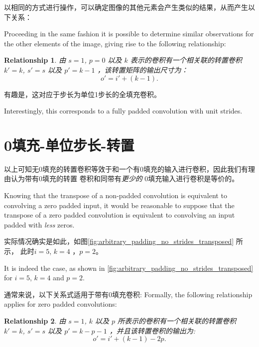 \documentclass[notitlepage]{report}
\newtheorem{relationship}{Relationship}
\begin{document}
以相同的方式进行操作，可以确定图像的其他元素会产生类似的结果，从而产生以下关系：

Proceeding in the same fashion it is possible to determine similar observations
for the other elements of the image, giving rise to the following relationship:

\begin{relationship}\label{rel:no_padding_no_strides_transposed}
由 $s = 1$, $p = 0$ 以及 $k$ 表示的卷积有一个相关联的转置卷积$k' = k$, $s' = s$ 以及
 $p' = k - 1$ ，该转置矩阵的输出尺寸为：
\begin{equation*}
    o' = i' + (k - 1).
\end{equation*}
\end{relationship}

有趣是，这对应于步长为单位1步长的全填充卷积。

Interestingly, this corresponds to a fully padded convolution with unit
strides.

\section{0填充-单位步长-转置}

以上可知无0填充的转置卷积等效于和一个有0填充的输入进行卷积，因此我们有理由认为带有0填充的转置
卷积和同带有{\em 更少的 \/}0填充输入进行卷积是等价的。

Knowing that the transpose of a non-padded convolution is equivalent to
convolving a zero padded input, it would be reasonable to suppose that the
transpose of a zero padded convolution is equivalent to convolving an input
padded with {\em less\/} zeros.

实际情况确实是如此，如图\autoref{fig:arbitrary_padding_no_strides_transposed} 所示，
此时$i = 5$, $k = 4$ ，$p = 2$。

It is indeed the case, as shown in
\autoref{fig:arbitrary_padding_no_strides_transposed} for $i = 5$, $k = 4$ and
$p = 2$.

通常来说，以下关系式适用于带有0填充卷积:
Formally, the following relationship applies for zero padded convolutions:


\begin{relationship}\label{rel:arbitrary_padding_no_strides_transposed}
由 $s = 1$, $k$ 以及 $p$ 所表示的卷积有一个相关联的转置卷积 $k' = k$, $s' = s$ 以及 $p' = k -
p - 1$ ，并且该转置卷积的输出为:
\begin{equation*}
    o' = i' + (k - 1) - 2p.
\end{equation*}
\end{relationship}
\end{document}

